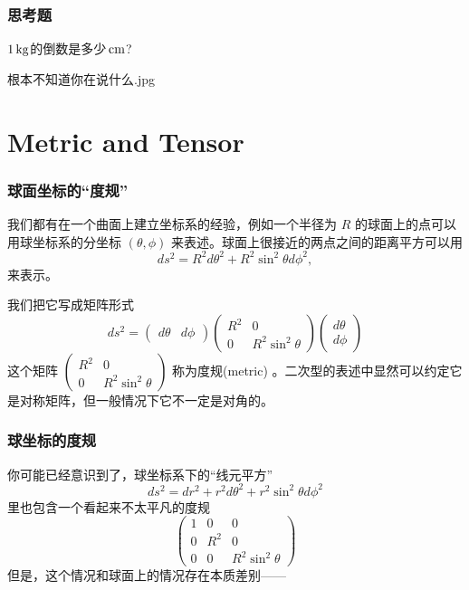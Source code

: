 \documentclass[CJK,13pt]{beamer}
\begin{document}
\begin{frame}
\frametitle{ 思考题 }

$1\,\mathrm{kg}$的倒数是多少$\,\mathrm{cm}$?

\bcenter
{}

根本不知道你在说什么.jpg
\ecenter

\end{frame}


\section{Metric and Tensor}




\begin{frame}
  \frametitle{球面坐标的“度规”}
  我们都有在一个曲面上建立坐标系的经验，例如一个半径为 $R$ 的球面上的点可以用球坐标系的分坐标 $(\theta,\phi)$ 来表述。球面上很接近的两点之间的距离平方可以用
  $$ ds^2 = R^2d\theta^2 + R^2\sin^2\theta d\phi^2, $$
  来表示。

  我们把它写成矩阵形式
  $$ ds^2 =  \begin{pmatrix}
    d\theta & d\phi 
  \end{pmatrix}
  \begin{pmatrix}
    R^2 & 0 \\
    0 & R^2\sin^2\theta
  \end{pmatrix}
 \begin{pmatrix}
   d\theta \\
   d\phi 
  \end{pmatrix}  
 $$
 这个矩阵
 $\begin{pmatrix}  R^2 & 0 \\    0 & R^2\sin^2\theta  \end{pmatrix}$
 称为{\blue 度规(metric)} 。二次型的表述中显然可以约定它是对称矩阵，但{\blue 一般情况下它不一定是对角的}。
\end{frame}

\begin{frame}
  \frametitle{球坐标的度规}
  你可能已经意识到了，球坐标系下的“线元平方”
  $$ ds^2 = dr^2 + r^2d\theta^2 + r^2\sin^2\theta d\phi^2$$
  里也包含一个看起来不太平凡的度规
  $$
  \begin{pmatrix}
    1 & 0   & 0 \\
    0 & R^2 & 0 \\
    0 & 0   & R^2\sin^2\theta
  \end{pmatrix}
  $$
  但是，这个情况和球面上的情况存在本质差别——
\end{frame}
\end{document}
